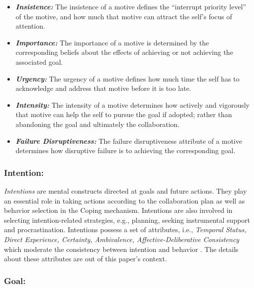 \documentclass[letterpaper]{article}
\begin{document}
\begin{itemize}
  \item \textbf{\textit{Insistence:}} The insistence of a motive defines the
  ``interrupt priority level'' of the motive, and how much that motive can
  attract the self's focus of attention.
  
  \item \textbf{\textit{Importance:}} The importance of a motive is determined
  by the corresponding beliefs about the effects of achieving or not achieving
  the associated goal.
  
  \item \textbf{\textit{Urgency:}} The urgency of a motive defines how much time
  the self has to acknowledge and address that motive before it is too late.
  
  \item \textbf{\textit{Intensity:}} The intensity of a motive determines how
  actively and vigorously that motive can help the self to pursue the goal if
  adopted; rather than abandoning the goal and ultimately the collaboration.
  
  \item \textbf{\textit{Failure Disruptiveness:}} The failure disruptiveness
  attribute of a motive determines how disruptive failure is to achieving the
  corresponding goal.
\end{itemize}

\subsubsection{Intention:}

\textit{Intentions} are mental constructs directed at goals and future actions.
They play an essential role in taking actions according to the collaboration
plan as well as behavior selection in the Coping mechanism. Intentions are
also involved in selecting intention-related strategies, e.g., planning, seeking
instrumental support and procrastination. Intentions possess a set of
attributes, i.e., \textit{Temporal Status, Direct Experience, Certainty,
Ambivalence, Affective-Deliberative Consistency} which moderate the consistency
between intention and behavior \cite{cooke:intention-behavior-consistency}. The
details about these attributes are out of this paper's context.

\subsubsection{Goal:}
\end{document}
